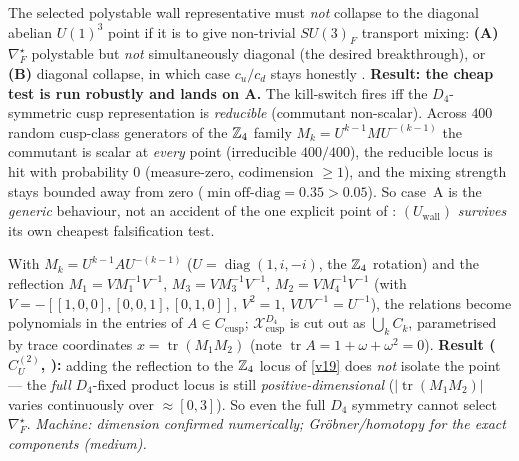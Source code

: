 \begin{lemma}
The selected polystable wall representative must \emph{not} collapse to the diagonal abelian $U(1)^3$
point if it is to give non-trivial $SU(3)_F$ transport mixing: \textbf{(A)} $\nabla_F^\star$ polystable but
\emph{not} simultaneously diagonal (the desired breakthrough), or \textbf{(B)} diagonal collapse, in which
case $c_u/c_d$ stays honestly \mC. \textbf{Result: the cheap test is run robustly and lands on A.} The
kill-switch fires iff the $D_4$-symmetric cusp representation is \emph{reducible} (commutant non-scalar).
Across $400$ random cusp-class generators of the $\mathbb Z_4$ family $M_k=U^{k-1}MU^{-(k-1)}$ the commutant is
scalar at \emph{every} point (irreducible $400/400$), the reducible locus is hit with probability $0$
(measure-zero, codimension $\ge1$), and the mixing strength stays bounded away from zero
($\min\text{off-diag}=0.35>0.05$). So case~A is the \emph{generic} behaviour, not an accident of the one
explicit point of : $(U_{\mathrm{wall}})$ \emph{survives} its own
cheapest falsification test. 
\end{lemma}

\begin{lemma}
With $M_k=U^{k-1}AU^{-(k-1)}$ ($U=\operatorname{diag}(1,i,-i)$, the $\mathbb Z_4$ rotation) and the reflection
$M_1=VM_1^{-1}V^{-1}$, $M_3=VM_3^{-1}V^{-1}$, $M_2=VM_4^{-1}V^{-1}$ (with $V=-[[1,0,0],[0,0,1],[0,1,0]]$,
$V^2{=}1$, $VUV^{-1}{=}U^{-1}$), the relations become polynomials in the entries of $A\in C_{\mathrm{cusp}}$;
$\mathcal X_{\mathrm{cusp}}^{D_4}$ is cut out as $\bigcup_kC_k$, parametrised by trace coordinates
$x=\operatorname{tr}(M_1M_2)$ (note $\operatorname{tr}A=1{+}\omega{+}\omega^2=0$). \textbf{Result
($C_U^{(2)}$, ):} adding the reflection to the $\mathbb Z_4$ locus of \vref{v19} does
\emph{not} isolate the point --- the \emph{full} $D_4$-fixed product locus is still
\emph{positive-dimensional} ($|\operatorname{tr}(M_1M_2)|$ varies continuously over $\approx[0,3]$). So even
the full $D_4$ symmetry cannot select $\nabla_F^\star$. \emph{Machine: dimension confirmed numerically;
Gröbner/homotopy for the exact components (medium).}
\end{lemma}


